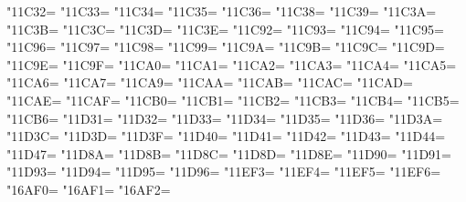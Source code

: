 \XeTeXcharclass"11C32=\KclassCM
\XeTeXcharclass"11C33=\KclassCM
\XeTeXcharclass"11C34=\KclassCM
\XeTeXcharclass"11C35=\KclassCM
\XeTeXcharclass"11C36=\KclassCM
\XeTeXcharclass"11C38=\KclassCM
\XeTeXcharclass"11C39=\KclassCM
\XeTeXcharclass"11C3A=\KclassCM
\XeTeXcharclass"11C3B=\KclassCM
\XeTeXcharclass"11C3C=\KclassCM
\XeTeXcharclass"11C3D=\KclassCM
\XeTeXcharclass"11C3E=\KclassCM
\XeTeXcharclass"11C92=\KclassCM
\XeTeXcharclass"11C93=\KclassCM
\XeTeXcharclass"11C94=\KclassCM
\XeTeXcharclass"11C95=\KclassCM
\XeTeXcharclass"11C96=\KclassCM
\XeTeXcharclass"11C97=\KclassCM
\XeTeXcharclass"11C98=\KclassCM
\XeTeXcharclass"11C99=\KclassCM
\XeTeXcharclass"11C9A=\KclassCM
\XeTeXcharclass"11C9B=\KclassCM
\XeTeXcharclass"11C9C=\KclassCM
\XeTeXcharclass"11C9D=\KclassCM
\XeTeXcharclass"11C9E=\KclassCM
\XeTeXcharclass"11C9F=\KclassCM
\XeTeXcharclass"11CA0=\KclassCM
\XeTeXcharclass"11CA1=\KclassCM
\XeTeXcharclass"11CA2=\KclassCM
\XeTeXcharclass"11CA3=\KclassCM
\XeTeXcharclass"11CA4=\KclassCM
\XeTeXcharclass"11CA5=\KclassCM
\XeTeXcharclass"11CA6=\KclassCM
\XeTeXcharclass"11CA7=\KclassCM
\XeTeXcharclass"11CA9=\KclassCM
\XeTeXcharclass"11CAA=\KclassCM
\XeTeXcharclass"11CAB=\KclassCM
\XeTeXcharclass"11CAC=\KclassCM
\XeTeXcharclass"11CAD=\KclassCM
\XeTeXcharclass"11CAE=\KclassCM
\XeTeXcharclass"11CAF=\KclassCM
\XeTeXcharclass"11CB0=\KclassCM
\XeTeXcharclass"11CB1=\KclassCM
\XeTeXcharclass"11CB2=\KclassCM
\XeTeXcharclass"11CB3=\KclassCM
\XeTeXcharclass"11CB4=\KclassCM
\XeTeXcharclass"11CB5=\KclassCM
\XeTeXcharclass"11CB6=\KclassCM
\XeTeXcharclass"11D31=\KclassCM
\XeTeXcharclass"11D32=\KclassCM
\XeTeXcharclass"11D33=\KclassCM
\XeTeXcharclass"11D34=\KclassCM
\XeTeXcharclass"11D35=\KclassCM
\XeTeXcharclass"11D36=\KclassCM
\XeTeXcharclass"11D3A=\KclassCM
\XeTeXcharclass"11D3C=\KclassCM
\XeTeXcharclass"11D3D=\KclassCM
\XeTeXcharclass"11D3F=\KclassCM
\XeTeXcharclass"11D40=\KclassCM
\XeTeXcharclass"11D41=\KclassCM
\XeTeXcharclass"11D42=\KclassCM
\XeTeXcharclass"11D43=\KclassCM
\XeTeXcharclass"11D44=\KclassCM
\XeTeXcharclass"11D47=\KclassCM
\XeTeXcharclass"11D8A=\KclassCM
\XeTeXcharclass"11D8B=\KclassCM
\XeTeXcharclass"11D8C=\KclassCM
\XeTeXcharclass"11D8D=\KclassCM
\XeTeXcharclass"11D8E=\KclassCM
\XeTeXcharclass"11D90=\KclassCM
\XeTeXcharclass"11D91=\KclassCM
\XeTeXcharclass"11D93=\KclassCM
\XeTeXcharclass"11D94=\KclassCM
\XeTeXcharclass"11D95=\KclassCM
\XeTeXcharclass"11D96=\KclassCM
\XeTeXcharclass"11EF3=\KclassCM
\XeTeXcharclass"11EF4=\KclassCM
\XeTeXcharclass"11EF5=\KclassCM
\XeTeXcharclass"11EF6=\KclassCM
\XeTeXcharclass"16AF0=\KclassCM
\XeTeXcharclass"16AF1=\KclassCM
\XeTeXcharclass"16AF2=\KclassCM
